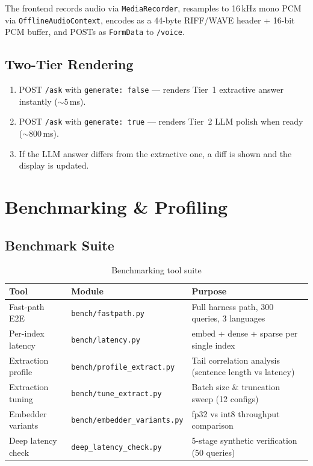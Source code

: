 \documentclass[12pt,a4paper]{article}
\begin{document}
The frontend records audio via \texttt{MediaRecorder}, resamples to 16\,kHz mono PCM via \texttt{OfflineAudioContext}, encodes as a 44-byte RIFF/WAVE header + 16-bit PCM buffer, and POSTs as \texttt{FormData} to \texttt{/voice}.

\subsection{Two-Tier Rendering}

\begin{enumerate}
    \item POST \texttt{/ask} with \texttt{generate: false} --- renders Tier~1 extractive answer instantly ($\sim$5\,ms).
    \item POST \texttt{/ask} with \texttt{generate: true} --- renders Tier~2 LLM polish when ready ($\sim$800\,ms).
    \item If the LLM answer differs from the extractive one, a diff is shown and the display is updated.
\end{enumerate}


\section{Benchmarking \& Profiling}

\subsection{Benchmark Suite}

\begin{table}[H]
\centering
\small
\begin{tabularx}{\textwidth}{l l X}
\toprule
\textbf{Tool} & \textbf{Module} & \textbf{Purpose} \\
\midrule
Fast-path E2E      & \texttt{bench/fastpath.py}          & Full harness path, 300 queries, 3 languages \\
Per-index latency  & \texttt{bench/latency.py}            & embed + dense + sparse per single index \\
Extraction profile & \texttt{bench/profile\_extract.py}   & Tail correlation analysis (sentence length vs latency) \\
Extraction tuning  & \texttt{bench/tune\_extract.py}      & Batch size \& truncation sweep (12 configs) \\
Embedder variants  & \texttt{bench/embedder\_variants.py} & fp32 vs int8 throughput comparison \\
Deep latency check & \texttt{deep\_latency\_check.py}     & 5-stage synthetic verification (50 queries) \\
\bottomrule
\end{tabularx}
\caption{Benchmarking tool suite}
\end{table}
\end{document}
